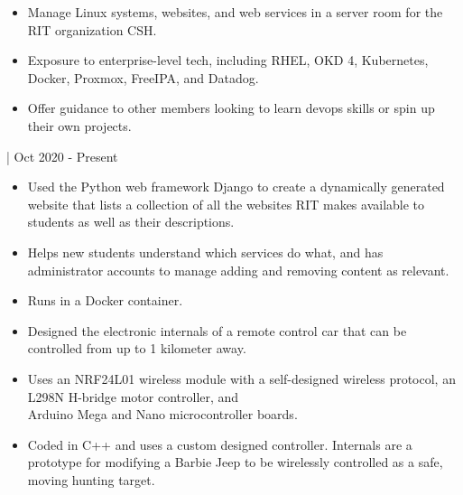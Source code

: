 \documentclass[11pt,letterpaper,ragged2e]{altacv}
\begin{document}

\begin{fullwidth}
\makecvheader
\end{fullwidth}




{
\begin{itemize}
    \item Manage Linux systems, websites, and web services in a server room for the RIT organization CSH.
    \item Exposure to enterprise-level tech, including RHEL, OKD 4, Kubernetes, Docker, Proxmox, FreeIPA, and Datadog.
    \item Offer guidance to other members looking to learn devops skills or spin up their own projects.
\end{itemize}
}
{| Oct 2020 - Present} \


{
\begin{itemize}
    \item Used the Python web framework Django to create a dynamically generated website that lists a collection of all the websites RIT makes available to students as well as their descriptions.
    \item Helps new students understand which services do what, and has administrator accounts to manage adding and removing content as relevant.
    \item Runs in a Docker container.
\end{itemize}
}
{}


{
\begin{itemize}
    \item Designed the electronic internals of a remote control car that can be controlled from up to 1 kilometer away.
    \item Uses an NRF24L01 wireless module with a self-designed wireless protocol, an L298N H-bridge motor controller, and \\ Arduino Mega and Nano microcontroller boards.
    \item Coded in C++ and uses a custom designed controller. Internals are a prototype for modifying a Barbie Jeep to be wirelessly controlled as a safe, moving hunting target.
\end{itemize}
}
{}
\end{document}
